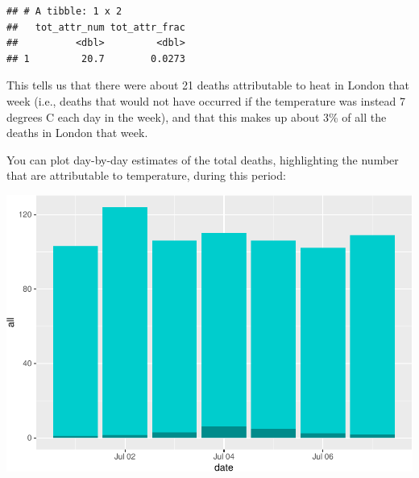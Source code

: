 \documentclass[
]{book}
\newenvironment{Shaded}{\begin{snugshade}}{\end{snugshade}}
\newcommand{\DataTypeTok}[1]{\textcolor[rgb]{0.13,0.29,0.53}{#1}}
\newcommand{\KeywordTok}[1]{\textcolor[rgb]{0.13,0.29,0.53}{\textbf{#1}}}
\newcommand{\NormalTok}[1]{#1}
\newcommand{\OperatorTok}[1]{\textcolor[rgb]{0.81,0.36,0.00}{\textbf{#1}}}
\newcommand{\StringTok}[1]{\textcolor[rgb]{0.31,0.60,0.02}{#1}}
\begin{document}
\begin{verbatim}
## # A tibble: 1 x 2
##   tot_attr_num tot_attr_frac
##          <dbl>         <dbl>
## 1         20.7        0.0273
\end{verbatim}

This tells us that there were about 21 deaths attributable to heat in London that week (i.e., deaths that would not have occurred if the temperature was instead 7 degrees C each day in the week), and that this makes up about 3\% of all the deaths in London that week.

You can plot day-by-day estimates of the total deaths, highlighting the number that are attributable to temperature, during this period:

\begin{Shaded}
\end{Shaded}

\includegraphics{adv_epi_analysis_files/figure-latex/unnamed-chunk-151-1.pdf}
\end{document}
